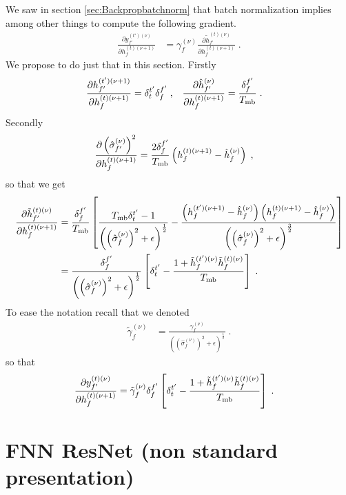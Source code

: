 \begin{subappendices}
We saw in section \ref{sec:Backpropbatchnorm} that batch normalization implies among other things to compute the following gradient.
\begin{align}
\frac{\partial y^{(t')(\nu)}_{f'}}{\partial h_{f}^{(t)(\nu+1)}}&=
%
\gamma^{(\nu)}_f\frac{\partial \tilde{h}_{f'}^{(t)(\nu)}}{\partial h_{f}^{(t)(\nu+1)}}\;.
\end{align}
We propose to do just that in this section. Firstly 
\begin{align}
\frac{\partial h^{(t')(\nu+1)}_{f'}}{\partial h_{f}^{(t)(\nu+1)}}&=\delta^{t'}_t\delta^{f'}_f\;,&
%
\frac{\partial \hat{h}_{f'}^{(\nu)}}{\partial h_{f}^{(t)(\nu+1)}}&=\frac{\delta^{f'}_f}{T_{{\rm mb}}}\;.
\end{align}
Secondly
\begin{align}
\frac{\partial \left(\hat{\sigma}_{f'}^{(\nu)}\right)^2}{\partial h_{f}^{(t)(\nu+1)}}&=
%
\frac{2\delta^{f'}_f}{T_{{\rm mb}}}\left(h_{f}^{(t)(\nu+1)}-\hat{h}_{f}^{(\nu)}\right)\;,
\end{align}
so that we get
\begin{align}
\frac{\partial \tilde{h}_{f'}^{(t)(\nu)}}{\partial h_{f}^{(t)(\nu+1)}}&=
%
\frac{\delta^{f'}_f}{T_{{\rm mb}}}\left[\frac{T_{{\rm mb}}\delta^{t'}_t-1}
%
{\left(\left(\hat{\sigma}_{f}^{(\nu)}\right)^2+\epsilon\right)^\frac12}-
%
\frac{\left(h_{f}^{(t')(\nu+1)}-\hat{h}_{f}^{(\nu)}\right)\left(h_{f}^{(t)(\nu+1)}-\hat{h}_{f}^{(\nu)}\right)}
%
{\left(\left(\hat{\sigma}_{f}^{(\nu)}\right)^2+\epsilon\right)^\frac32}\right]\notag\\
%
&=\frac{\delta^{f'}_f}{\left(\left(\hat{\sigma}_{f}^{(\nu)}\right)^2+\epsilon\right)^\frac12}
%
\left[\delta^{t'}_t-
%
\frac{1+\tilde{h}_{f}^{(t')(\nu)}\tilde{h}_{f}^{(t)(\nu)}}{T_{{\rm mb}}}\right]\;.
\end{align}
To ease the notation recall that we denoted
\begin{align}
\tilde{\gamma}^{(\nu)}_f&=
%
\frac{\gamma^{(\nu)}_f}{\left(\left(\hat{\sigma}_{f}^{(\nu)}\right)^2+\epsilon\right)^\frac12}\;.
\end{align}
%
%
so that
\begin{align}
\frac{\partial y_{f'}^{(t)(\nu)}}{\partial h_{f}^{(t)(\nu+1)}}&=
%
\tilde{\gamma}^{(\nu)}_f \delta^{f'}_f\left[\delta^{t'}_t-
%
\frac{1+\tilde{h}_{f}^{(t')(\nu)}\tilde{h}_{f}^{(t)(\nu)}}{T_{{\rm mb}}}\right]\;.
\end{align}



\section{FNN ResNet (non standard presentation)} \label{sec:ResnetFNN}


\end{subappendices}

